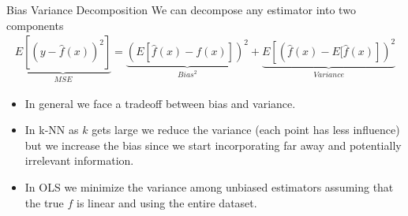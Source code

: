 \begin{comment}
\begin{frame}{Comparisons}
  \begin{itemize}
  \item What would happen if $K \rightarrow N$?
  \item The k-NN model is locally constant.
  \item The k-NN approach tends to be really bumpy which can be undesirable.
  \item The OLS model is globally linear (is this always true?)
  \end{itemize}
  \end{frame}
  \begin{frame}{What about?}
  \begin{itemize}
  \item If we fixed the fact that there are discrete jumps in who is in the neighborhood by smoothly weighting observations and varying those weights instead (Kernels).
  \item Another drawback of $k-NN$ is that we consider distance in each $X$ dimension on the same scale, perhaps we could rescale the data to improve our ``closeness'' measure.
  \item Instead of fitting a constant locally, we fit a linear function locally (Lowess).
  \item Instead of using a global linear approximation in OLS use a more flexible nonlinear one.
  \item There is a bias/variance tradeoff. \alert{explain}.
  \end{itemize}
\end{frame}
\end{comment}

\begin{frame}{Bias Variance Decomposition}
We can decompose any estimator into two components
\begin{eqnarray*}
\underbrace{E[(y- \hat{f}(x))^2]}_{MSE} =\underbrace{\left( E[\hat{f}(x) - f(x)] \right)^2}_{Bias^2}  +  \underbrace{E \left[ \left(\hat{f}(x) - E[\hat{f}(x) \right] \right)^2}_{Variance} 
\end{eqnarray*}
\begin{itemize}
\item In general we face a tradeoff between bias and variance.
\item In k-NN as $k$ gets large we reduce the variance (each point has less influence) but we increase the bias since we start incorporating far away and potentially irrelevant information.
\item In OLS we minimize the variance among unbiased estimators assuming that the true $f$ is linear and using the entire dataset. 
\end{itemize}
\end{frame}


